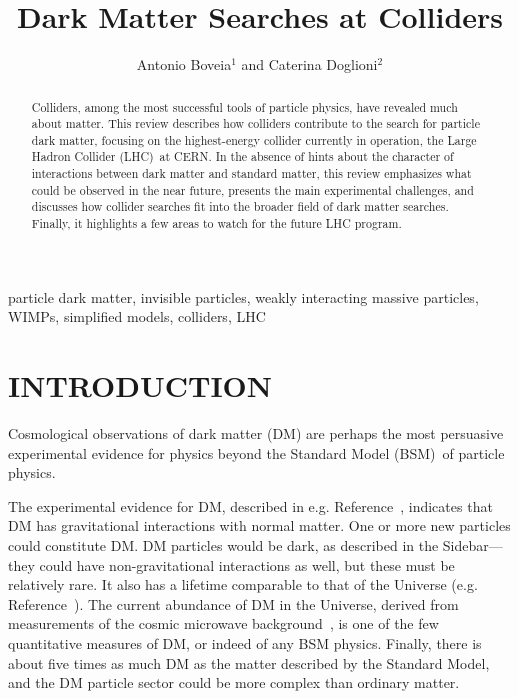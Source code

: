 \documentclass{ar-1col}
\begin{document}

\title{Dark Matter Searches at Colliders}

\author{Antonio Boveia$^1$ and Caterina Doglioni$^2$
 }

\begin{abstract}

Colliders, among the most successful tools of particle physics,
have revealed much about matter. This review describes how
colliders contribute to the search for particle dark matter,
focusing on the highest-energy collider currently in operation,
the Large Hadron Collider (LHC)\ at CERN. In the absence of hints about the character
of interactions between dark matter and standard matter, this review emphasizes what could be observed in the
near future, presents the main experimental challenges, and discusses how
collider searches fit into the broader field of dark matter searches. Finally, it
highlights a few areas to watch for the future LHC program.
\end{abstract}

\begin{keywords}
particle dark matter, invisible particles, weakly interacting
massive particles, WIMPs, simplified models, colliders, LHC
\end{keywords}

\maketitle

\tableofcontents

\section{INTRODUCTION}\label{sec:intro}

Cosmological observations of dark matter (DM) are perhaps the most persuasive experimental
evidence for physics beyond the Standard Model (BSM)\ of particle
physics. 

The experimental evidence for DM, described in e.g. Reference~\cite{Bertone:2004pz},
indicates that DM has gravitational interactions with normal matter. 
One or more new particles could constitute DM.
DM particles would be dark, as described in the Sidebar---they could have non-gravitational
interactions as well, but these must be relatively rare.  
It also has a lifetime comparable to that of the Universe
(e.g. Reference~\cite{Cohen:2016uyg}). 
The current abundance of DM in the Universe, derived from
measurements of the cosmic microwave
background~\cite{Ade:2015xua}, is one of the few quantitative
measures of DM, or indeed of any BSM physics. 
Finally, there is about five times as much DM as the matter described by the Standard Model,
and the DM particle sector could be more complex than ordinary matter. 
\end{document}
